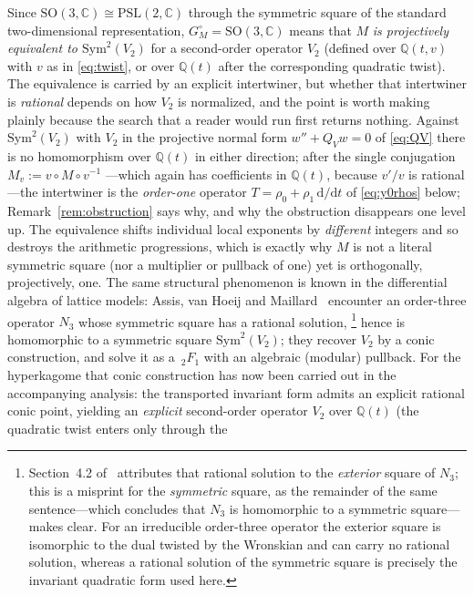 \documentclass[11pt]{article}
\newcommand{\rmd}{\mathrm{d}}
\theoremstyle{plain}
\theoremstyle{remark}
\begin{document}
Since $\mathrm{SO}(3,\mathbb{C})\cong\mathrm{PSL}(2,\mathbb{C})$ through the symmetric square of the standard
two-dimensional representation, $G_M^\circ=\mathrm{SO}(3,\mathbb{C})$ means that $M$ \emph{is projectively equivalent
to $\mathrm{Sym}^2(V_2)$} for a second-order operator $V_2$ (defined over $\mathbb{Q}(t,v)$ with $v$ as in
\eqref{eq:twist}, or over $\mathbb{Q}(t)$ after the corresponding quadratic twist). The equivalence is carried by
an explicit intertwiner, but whether that intertwiner is \emph{rational} depends on how $V_2$ is normalized, and
the point is worth making plainly because the search that a reader would run first returns nothing. Against
$\mathrm{Sym}^2(V_2)$ with $V_2$ in the projective normal form $w''+Q_Vw=0$ of \eqref{eq:QV} there is no
homomorphism over $\mathbb{Q}(t)$ in either direction; after the single conjugation $M_v:=v\circ M\circ v^{-1}$
---which again has coefficients in $\mathbb{Q}(t)$, because $v'/v$ is rational---the intertwiner is the
\emph{order-one} operator $T=\rho_0+\rho_1\,\rmd/\rmd t$ of \eqref{eq:y0rhos} below; Remark~\ref{rem:obstruction}
says why, and why the obstruction disappears one level up.
The equivalence shifts individual local exponents by \emph{different} integers and so destroys
the arithmetic progressions, which is exactly why $M$ is not a literal symmetric square (nor a multiplier or
pullback of one) yet is orthogonally, projectively, one. The same structural phenomenon is known in the differential
algebra of lattice models: Assis, van Hoeij and Maillard~\cite{AVM2016} encounter an order-three operator $N_3$
whose symmetric square has a rational solution,%
\footnote{Section~4.2 of~\cite{AVM2016} attributes that rational solution to the \emph{exterior} square of
$N_3$; this is a misprint for the \emph{symmetric} square, as the remainder of the same sentence---which
concludes that $N_3$ is homomorphic to a symmetric square---makes clear. For an irreducible order-three
operator the exterior square is isomorphic to the dual twisted by the Wronskian and can carry no rational
solution, whereas a rational solution of the symmetric square is precisely the invariant quadratic form used
here.}
hence is homomorphic to a symmetric square $\mathrm{Sym}^2(V_2)$; they recover $V_2$ by a conic construction,
and solve it as a $\,_2F_1$ with an algebraic (modular) pullback. For the hyperkagome that conic construction has now been carried
out in the accompanying analysis: the transported invariant form admits an explicit rational conic point, yielding
an \emph{explicit} second-order operator $V_2$ over $\mathbb{Q}(t)$ (the quadratic twist enters only through the
\end{document}
